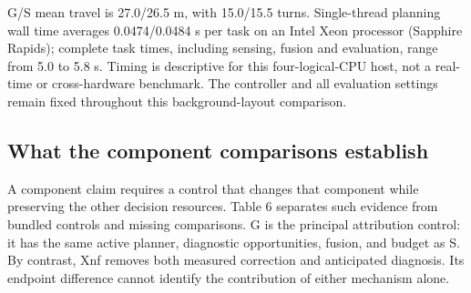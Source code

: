 \documentclass[11pt,a4paper]{article}
\providecommand{\hypertarget}[2]{#2}
\begin{document}
G/S mean travel is 27.0/26.5 m, with 15.0/15.5 turns. Single-thread planning wall time averages 0.0474/0.0484 s per task on an Intel Xeon processor (Sapphire Rapids); complete task times, including sensing, fusion and evaluation, range from 5.0 to 5.8 s. Timing is descriptive for this four-logical-CPU host, not a real-time or cross-hardware benchmark. The controller and all evaluation settings remain fixed throughout this background-layout comparison.

\hypertarget{what-the-component-comparisons-establish}{%
\subsection{What the component comparisons establish}\label{what-the-component-comparisons-establish}}

A component claim requires a control that changes that component while preserving the other decision resources. Table 6 separates such evidence from bundled controls and missing comparisons. G is the principal attribution control: it has the same active planner, diagnostic opportunities, fusion, and budget as S. By contrast, Xnf removes both measured correction and anticipated diagnosis. Its endpoint difference cannot identify the contribution of either mechanism alone.
\end{document}
